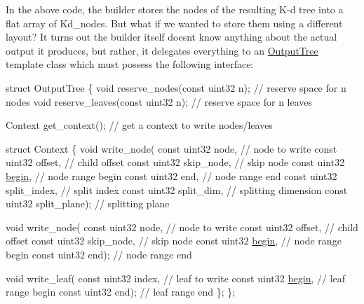 \begin{DoxyParagraph}{}
In the above code, the builder stores the nodes of the resulting K-\/d tree into a flat array of Kd\+\_\+node\textquotesingle{}s. But what if we wanted to store them using a different layout? It turns out the builder itself doesn\textquotesingle{}t know anything about the actual output it produces, but rather, it delegates everything to an \hyperlink{structcugar_1_1cuda_1_1_kd__builder_KdOutputTreeAnchor}{Output\+Tree} template class which must possess the following interface\+: 
\begin{DoxyCode}
\textcolor{keyword}{struct }OutputTree
\{
   \textcolor{keywordtype}{void} reserve\_nodes(\textcolor{keyword}{const} uint32 n);  \textcolor{comment}{// reserve space for n nodes}
   \textcolor{keywordtype}{void} reserve\_leaves(\textcolor{keyword}{const} uint32 n); \textcolor{comment}{// reserve space for n leaves}

   Context get\_context();             \textcolor{comment}{// get a context to write nodes/leaves}

   \textcolor{keyword}{struct }Context
   \{
       \textcolor{keywordtype}{void} write\_node(
          \textcolor{keyword}{const} uint32 node,          \textcolor{comment}{// node to write}
          \textcolor{keyword}{const} uint32 offset,        \textcolor{comment}{// child offset}
          \textcolor{keyword}{const} uint32 skip\_node,     \textcolor{comment}{// skip node}
          \textcolor{keyword}{const} uint32 \hyperlink{group___basic_ga7a37aba0ec0ff22738563bca83609dca}{begin},         \textcolor{comment}{// node range begin}
          \textcolor{keyword}{const} uint32 end,           \textcolor{comment}{// node range end}
          \textcolor{keyword}{const} uint32 split\_index,   \textcolor{comment}{// split index}
          \textcolor{keyword}{const} uint32 split\_dim,     \textcolor{comment}{// splitting dimension}
          \textcolor{keyword}{const} uint32 split\_plane);  \textcolor{comment}{// splitting plane}

       \textcolor{keywordtype}{void} write\_node(
          \textcolor{keyword}{const} uint32 node,          \textcolor{comment}{// node to write}
          \textcolor{keyword}{const} uint32 offset,        \textcolor{comment}{// child offset}
          \textcolor{keyword}{const} uint32 skip\_node,     \textcolor{comment}{// skip node}
          \textcolor{keyword}{const} uint32 \hyperlink{group___basic_ga7a37aba0ec0ff22738563bca83609dca}{begin},         \textcolor{comment}{// node range begin}
          \textcolor{keyword}{const} uint32 end);          \textcolor{comment}{// node range end}

       \textcolor{keywordtype}{void} write\_leaf(
          \textcolor{keyword}{const} uint32 index,         \textcolor{comment}{// leaf to write}
          \textcolor{keyword}{const} uint32 \hyperlink{group___basic_ga7a37aba0ec0ff22738563bca83609dca}{begin},         \textcolor{comment}{// leaf range begin}
          \textcolor{keyword}{const} uint32 end);          \textcolor{comment}{// leaf range end}
   \};
\};
\end{DoxyCode}

\end{DoxyParagraph}
